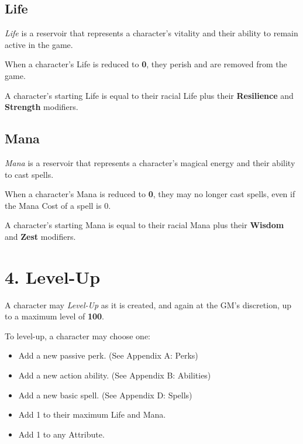 \subsection{Life}
\textit{Life} is a reservoir that represents a character's vitality 
and their ability to remain active in the game.

\vspace{0.4em}

When a character's Life is reduced to \textbf{0}, 
they perish and are removed from the game.

\vspace{0.4em}

A character's starting Life is equal to their racial Life 
plus their \textbf{Resilience} and \textbf{Strength} modifiers. 


\subsection{Mana}
\textit{Mana} is a reservoir that represents a character's magical energy
and their ability to cast spells.

\vspace{0.4em}

When a character's Mana is reduced to \textbf{0},
they may no longer cast spells, even if the Mana Cost of a spell is 0.

\vspace{0.4em}

A character's starting Mana is equal to their racial Mana 
plus their \textbf{Wisdom} and \textbf{Zest} modifiers.


\section{4. Level-Up}
A character may \textit{Level-Up} as it is created, 
and again at the GM's discretion, 
up to a maximum level of \textbf{100}.

\vspace{0.4em}

To level-up, a character may choose one:
\begin{itemize}
  \item Add a new passive perk. (See Appendix A: Perks)
  \item Add a new action ability. (See Appendix B: Abilities)
  \item Add a new basic spell. (See Appendix D: Spells)
  \item Add 1 to their maximum Life and Mana.
  \item Add 1 to any Attribute.
\end{itemize}

